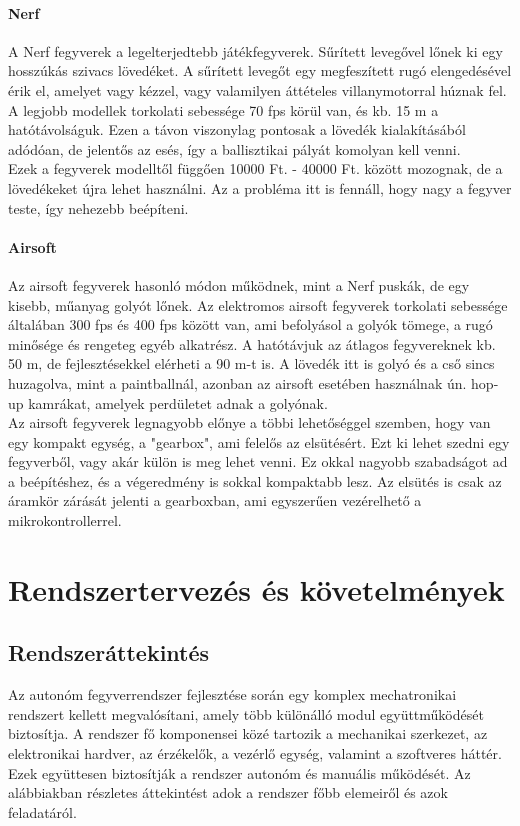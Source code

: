 \documentclass[12pt,a4paper]{article}
\begin{document}
\paragraph{Nerf \cite{nerf}}

A Nerf fegyverek a legelterjedtebb játékfegyverek. Sűrített levegővel lőnek ki egy hosszúkás szivacs lövedéket. A sűrített levegőt egy megfeszített rugó elengedésével érik el, amelyet vagy kézzel, vagy valamilyen áttételes villanymotorral húznak fel. A legjobb modellek torkolati sebessége 70 fps körül van, és kb. 15 m a hatótávolságuk. Ezen a távon viszonylag pontosak a lövedék kialakításából adódóan, de jelentős az esés, így a ballisztikai pályát komolyan kell venni. \\

Ezek a fegyverek modelltől függően 10000 Ft. - 40000 Ft. között mozognak, de a lövedékeket újra lehet használni. Az a probléma itt is fennáll, hogy nagy a fegyver teste, így nehezebb beépíteni. 

\paragraph{Airsoft \cite{airsoft}}

Az airsoft fegyverek hasonló módon működnek, mint a Nerf puskák, de egy kisebb, műanyag golyót lőnek. Az elektromos airsoft fegyverek torkolati sebessége általában 300 fps és 400 fps között van, ami befolyásol a golyók tömege, a rugó minősége és rengeteg egyéb alkatrész. A hatótávjuk az átlagos fegyvereknek kb. 50 m, de fejlesztésekkel elérheti a 90 m-t is. A lövedék itt is golyó és a cső sincs huzagolva, mint a paintballnál, azonban az airsoft esetében használnak ún. hop-up kamrákat, amelyek perdületet adnak a golyónak.\\

Az airsoft fegyverek legnagyobb előnye a többi lehetőséggel szemben, hogy van egy kompakt egység, a "gearbox", ami felelős az elsütésért. Ezt ki lehet szedni egy fegyverből, vagy akár külön is meg lehet venni. Ez okkal nagyobb szabadságot ad a beépítéshez, és a végeredmény is sokkal kompaktabb lesz. Az elsütés is csak az áramkör zárását jelenti a gearboxban, ami egyszerűen vezérelhető a mikrokontrollerrel.
\pagebreak

\section{Rendszertervezés és követelmények}
\subsection{Rendszeráttekintés}
Az autonóm fegyverrendszer fejlesztése során egy komplex mechatronikai rendszert kellett megvalósítani, amely több különálló modul együttműködését biztosítja. A rendszer fő komponensei közé tartozik a mechanikai szerkezet, az elektronikai hardver, az érzékelők, a vezérlő egység, valamint a szoftveres háttér. Ezek együttesen biztosítják a rendszer autonóm és manuális működését. Az alábbiakban részletes áttekintést adok a rendszer főbb elemeiről és azok feladatáról.
\end{document}
